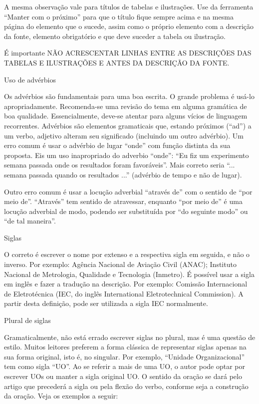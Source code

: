 \begin{enumerate}[label=\alph*)]
A mesma observação vale para títulos de tabelas e ilustrações. Use da ferramenta “Manter com o próximo” para que o título fique sempre acima e na mesma página do elemento que o sucede, assim como o próprio elemento com a descrição da fonte, elemento obrigatório e que deve suceder a tabela ou ilustração.

É importante NÃO ACRESCENTAR LINHAS ENTRE AS DESCRIÇÕES DAS TABELAS E ILUSTRAÇÕES E ANTES DA DESCRIÇÃO DA FONTE.

{\bfseries \item  Uso de advérbios}

Os advérbios são fundamentais para uma boa escrita. O grande problema é usá-lo apropriadamente. Recomenda-se uma revisão do tema em alguma gramática de boa qualidade. Essencialmente, deve-se atentar para alguns vícios de linguagem recorrentes. Advérbios são elementos gramaticais que, estando próximos (“ad”) a um verbo, adjetivo alteram seu significado (incluindo um outro advérbio). Um erro comum é usar o advérbio de lugar “onde” com função distinta da sua proposta. Eis um uso inapropriado do adverbio “onde”: “Eu fiz um experimento semana passada onde os resultados foram favoráveis”. Mais correto seria “... semana passada quando os resultados ...” (advérbio de tempo e não de lugar).

Outro erro comum é usar a locução adverbial “através de” com o sentido de “por meio de”. “Através” tem sentido de atravessar, enquanto “por meio de” é uma locução adverbial de modo, podendo ser substituída por “do seguinte modo” ou “de tal maneira”.

{\bfseries \item  Siglas}

O correto é escrever o nome por extenso e a respectiva sigla em seguida, e não o inverso. Por exemplo: Agência Nacional de Aviação Civil (ANAC); Instituto Nacional de Metrologia, Qualidade e Tecnologia (Inmetro).
É possível usar a sigla em inglês e fazer a tradução na descrição. Por exemplo: Comissão Internacional de Eletrotécnica (IEC, do inglês International Eletrotechnical Commission). A partir desta definição, pode ser utilizada a sigla IEC normalmente.

{\bfseries \item  Plural de siglas}

Gramaticalmente, não está errado escrever siglas no plural, mas é uma questão de estilo. Muitos leitores preferem a forma clássica de representar siglas apenas na sua forma original, isto é, no singular. Por exemplo, “Unidade Organizacional” tem como sigla “UO”. Ao se referir a mais de uma UO, o autor pode optar por escrever UOs ou manter a sigla original UO. O sentido da oração se dará pelo artigo que precederá a sigla ou pela flexão do verbo, conforme seja a construção da oração. Veja os exemplos a seguir:


\end{enumerate}
